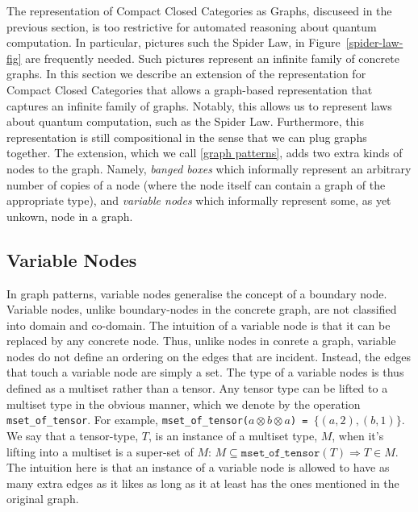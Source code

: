 \documentclass[runningheads]{llncs}
\newcommand{\tensor}{\otimes}
\begin{document}
The representation of Compact Closed Categories as Graphs, discuseed
in the previous section, is too restrictive for automated reasoning
about quantum computation. In particular, pictures such the Spider
Law, in Figure~\ref{spider-law-fig} are frequently needed. Such
pictures represent an infinite family of concrete graphs. In this
section we describe an extension of the representation for Compact
Closed Categories that allows a graph-based representation that
captures an infinite family of graphs. Notably, this allows us to
represent laws about quantum computation, such as the Spider
Law. Furthermore, this representation is still compositional in the
sense that we can plug graphs together. The extension, which we call
\ref{graph patterns}, adds two extra kinds of nodes to the
graph. Namely, {\em banged boxes} which informally represent an
arbitrary number of copies of a node (where the node itself can
contain a graph of the appropriate type), and {\em variable nodes}
which informally represent some, as yet unkown, node in a graph.




\subsection{Variable Nodes}

In graph patterns, variable nodes generalise the concept of a boundary
node. Variable nodes, unlike boundary-nodes in the concrete graph, are
not classified into domain and co-domain. The intuition of a variable
node is that it can be replaced by any concrete node. Thus, unlike
nodes in conrete a graph, variable nodes do not define an ordering on
the edges that are incident. Instead, the edges that touch a variable
node are simply a set. The type of a variable nodes is thus defined as
a multiset rather than a tensor. Any tensor type can be lifted to a
multiset type in the obvious manner, which we denote by the operation
{\tt mset\_of\_tensor}. For example, {\tt mset\_of\_tensor($a \tensor
  b \tensor a$) = $\{(a,2), (b,1)\}$}. We say that a tensor-type, $T$,
is an instance of a multiset type, $M$, when it's lifting into a
multiset is a super-set of $M$: $ M \subseteq
\mathtt{mset\_of\_tensor}(T) \Longrightarrow T \in M$. The intuition
here is that an instance of a variable node is allowed to have as many
extra edges as it likes as long as it at least has the ones mentioned
in the original graph.
\end{document}
